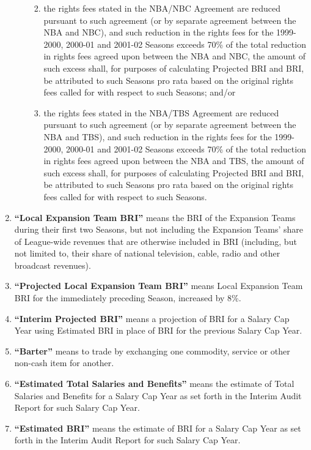 \documentclass[
]{book}
\providecommand{\tightlist}{%
  \setlength{\itemsep}{0pt}\setlength{\parskip}{0pt}}
\begin{document}
\begin{enumerate}
\begin{enumerate}
    \begin{enumerate}
    \def\labelenumiii{(\roman{enumiii})}
    \tightlist
    \item
      the rights fees stated in the NBA/NBC Agreement are reduced pursuant to such agreement (or by separate agreement between the NBA and NBC), and such reduction in the rights fees for the 1999-2000, 2000-01 and 2001-02 Seasons exceeds 70\% of the total reduction in rights fees agreed upon between the NBA and NBC, the amount of such excess shall, for purposes of calculating Projected BRI and BRI, be attributed to such Seasons pro rata based on the original rights fees called for with respect to such Seasons; and/or
    \item
      the rights fees stated in the NBA/TBS Agreement are reduced pursuant to such agreement (or by separate agreement between the NBA and TBS), and such reduction in the rights fees for the 1999-2000, 2000-01 and 2001-02 Seasons exceeds 70\% of the total reduction in rights fees agreed upon between the NBA and TBS, the amount of such excess shall, for purposes of calculating Projected BRI and BRI, be attributed to such Seasons pro rata based on the original rights fees called for with respect to such Seasons.
    \end{enumerate}
  \end{enumerate}
\item
  \textbf{``Local Expansion Team BRI''} means the BRI of the Expansion Teams during their first two Seasons, but not including the Expansion Teams' share of League-wide revenues that are otherwise included in BRI (including, but not limited to, their share of national television, cable, radio and other broadcast revenues).
\item
  \textbf{``Projected Local Expansion Team BRI''} means Local Expansion Team BRI for the immediately preceding Season, increased by 8\%.
\item
  \textbf{``Interim Projected BRI''} means a projection of BRI for a Salary Cap Year using Estimated BRI in place of BRI for the previous Salary Cap Year.
\item
  \textbf{``Barter''} means to trade by exchanging one commodity, service or other non-cash item for another.
\item
  \textbf{``Estimated Total Salaries and Benefits''} means the estimate of Total Salaries and Benefits for a Salary Cap Year as set forth in the Interim Audit Report for such Salary Cap Year.
\item
  \textbf{``Estimated BRI''} means the estimate of BRI for a Salary Cap Year as set forth in the Interim Audit Report for such Salary Cap Year.
\end{enumerate}
\end{document}
